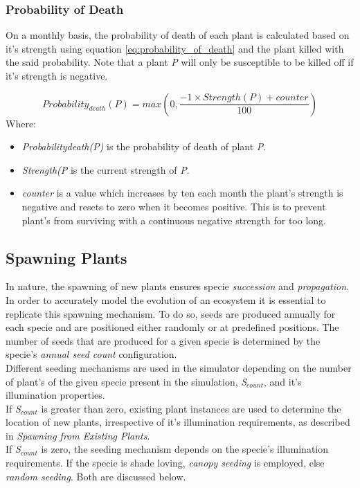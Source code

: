 \subsubsection{Probability of Death}

On a monthly basis, the probability of death of each plant is calculated based on it's strength using equation \ref{eq:probability_of_death} and the plant killed with the said probability. Note that a plant \textit{P} will only be susceptible to be killed off if it's strength is negative. 

\begin{equation}
Probability_{death}(P) = max(0, \frac{-1 \times Strength(P) + counter}{100})
\label{eq:probability_of_death}
\end{equation}
Where:
\begin{itemize}
\item \textit{Probability{death}(P)} is the probability of death of plant \textit{P}.
\item \textit{Strength(\textit{P}} is the current strength of \textit{P}.
\item \textit{counter} is a value which increases by ten each month the plant's strength is negative and resets to zero when it becomes positive. This is to prevent plant's from surviving with a continuous negative strength for too long.
\end{itemize}

\subsection{Spawning Plants}

In nature, the spawning of new plants ensures specie \textit{succession} and \textit{propagation}. In order to accurately model the evolution of an ecosystem it is essential to replicate this spawning mechanism. To do so, seeds are produced annually for each specie and are positioned either randomly or at predefined positions. The number of seeds that are produced for a given specie is determined by the specie's \textit{annual seed count} configuration.\\

Different seeding mechanisms are used in the simulator depending on the number of plant's of the given specie present in the simulation, \textit{S$_{count}$}, and it's illumination properties.\\
If \textit{S$_{count}$} is greater than zero, existing plant instances are used to determine the location of new plants, irrespective of it's illumination requirements, as described in \textit{Spawning from Existing Plants}.\\
If \textit{S$_{count}$} is zero, the seeding mechanism depends on the specie's illumination requirements. If the specie is shade loving, \textit{canopy seeding} is employed, else \textit{random seeding}. Both are discussed below.

